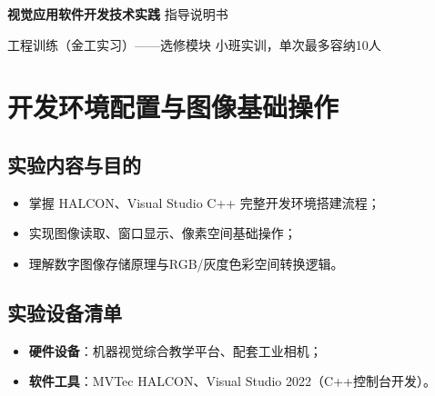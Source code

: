 \documentclass[UTF8,a4paper,12pt]{ctexart}
\begin{document}
\begin{titlepage}
\thispagestyle{empty}
\begin{center}
\vspace*{5cm}

{\Huge\bfseries 视觉应用软件开发技术实践}
\vspace{1cm}
{\LARGE 指导说明书}

\vspace{2.8cm}
{\large 工程训练（金工实习）——选修模块}
\vspace{0.6cm}
{\large 小班实训，单次最多容纳10人}

\vfill
\vspace{3cm}
\end{center}
\end{titlepage}

\tableofcontents
\newpage
\setcounter{page}{1}

\section{开发环境配置与图像基础操作}
\subsection{实验内容与目的}
\begin{itemize}
    \item 掌握 HALCON、Visual Studio C++ 完整开发环境搭建流程；
    \item 实现图像读取、窗口显示、像素空间基础操作；
    \item 理解数字图像存储原理与RGB/灰度色彩空间转换逻辑。
\end{itemize}

\subsection{实验设备清单}
\begin{itemize}
    \item \textbf{硬件设备}：机器视觉综合教学平台、配套工业相机；
    \item \textbf{软件工具}：MVTec HALCON、Visual Studio 2022（C++控制台开发）。
\end{itemize}

\end{document}
